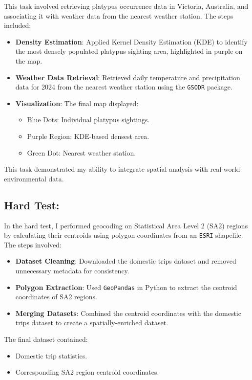 \documentclass{article}
\newcommand{\code}[1]{\colorbox{customgray}{\texttt{#1}}}
\begin{document}
This task involved retrieving platypus occurrence data in Victoria, Australia, and associating it with weather data from the nearest weather station. The steps included:
\begin{itemize}
    \item \textbf{Density Estimation}: Applied Kernel Density Estimation (KDE) to identify the most densely populated platypus sighting area, highlighted in purple on the map.
    \item \textbf{Weather Data Retrieval}: Retrieved daily temperature and precipitation data for 2024 from the nearest weather station using the \code{GSODR} package.
    \item \textbf{Visualization}: The final map displayed:
    \begin{itemize}
        \item Blue Dots: Individual platypus sightings.
        \item Purple Region: KDE-based densest area.
        \item Green Dot: Nearest weather station.
    \end{itemize}
\end{itemize}

This task demonstrated my ability to integrate spatial analysis with real-world environmental data.

\subsection{Hard Test:}

In the hard test, I performed geocoding on Statistical Area Level 2 (SA2) regions by calculating their centroids using polygon coordinates from an \code{ESRI} shapefile. The steps involved:

\begin{itemize}
    \item \textbf{Dataset Cleaning}: Downloaded the domestic trips dataset and removed unnecessary metadata for consistency.
    \item \textbf{Polygon Extraction}: Used \code{GeoPandas} in Python to extract the centroid coordinates of SA2 regions.
    \item \textbf{Merging Datasets}: Combined the centroid coordinates with the domestic trips dataset to create a spatially-enriched dataset.
\end{itemize}

The final dataset contained:
\begin{itemize}
    \item Domestic trip statistics.
    \item Corresponding SA2 region centroid coordinates.
\end{itemize}
\end{document}
